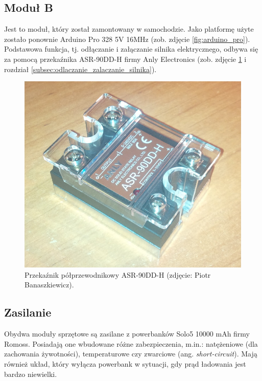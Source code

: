 \subsection{Moduł B}
\label{subsec:modul_b}

Jest to moduł, który został zamontowany w samochodzie. Jako platformę użyte zostało ponownie Arduino Pro 328 5V 16MHz \cite{Ard00} (zob. zdjęcie \ref{fig:arduino_pro}). Podstawowa funkcja, tj. odłączanie i załączanie silnika elektrycznego, odbywa się za pomocą przekaźnika ASR-90DD-H firmy Anly Electronics (zob. zdjęcie \ref{fig:SSR_relay} i rozdział \ref{subsec:odlaczanie_zalaczanie_silnika}).  %

\begin{figure}[h]
	\centering
	\includegraphics[scale=0.3]{pics/Anly_ASR90DDH.jpg}
	\caption{\label{fig:SSR_relay}Przekaźnik półprzewodnikowy ASR-90DD-H  (zdjęcie: Piotr Banaszkiewicz).}
\end{figure}

\subsection{Zasilanie}
\label{subsec:zasilanie}

Obydwa moduły sprzętowe są zasilane z powerbanków Solo5 10000 mAh firmy Romoss. Posiadają one wbudowane różne zabezpieczenia, m.in.: natężeniowe (dla zachowania żywotności), temperaturowe czy zwarciowe (ang. \textit{short-circuit}). Mają również układ, który wyłącza powerbank w sytuacji, gdy prąd ładowania jest bardzo niewielki.  %

